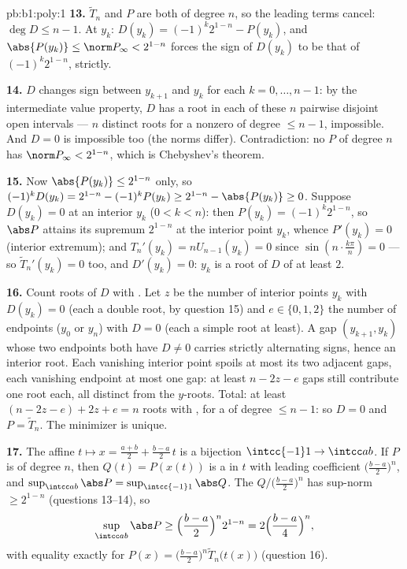 \begin{solution}{pb:b1:poly:1}
\textbf{13.} $\widetilde T_n$ and $P$ are both  of degree
$n$, so the leading terms cancel: $\deg D \leq n - 1$. At $y_k$:
$D(y_k) = (-1)^k2^{1-n} - P(y_k)$, and $\abs{P(y_k)} \leq \norm
P_\infty < 2^{1-n}$ forces the sign of $D(y_k)$ to be that of
$(-1)^k2^{1-n}$, strictly.

\textbf{14.} $D$ changes sign between $y_{k+1}$ and $y_k$ for each
$k = 0, \dots, n-1$: by the intermediate value property, $D$ has a
root in each of these $n$ pairwise disjoint open intervals --- $n$
distinct roots for a nonzero  of degree $\leq n - 1$,
impossible. And $D = 0$ is impossible too (the norms differ).
Contradiction: no  $P$ of degree $n$ has $\norm P_\infty <
2^{1-n}$, which is Chebyshev's theorem.

\textbf{15.} Now $\abs{P(y_k)} \leq 2^{1-n}$ only, so $(-1)^k
D(y_k) = 2^{1-n} - (-1)^kP(y_k) \geq 2^{1-n} - \abs{P(y_k)} \geq
0$. Suppose $D(y_k) = 0$ at an interior $y_k$ ($0 < k < n$): then
$P(y_k) = (-1)^k2^{1-n}$, so $\abs P$ attains its supremum
$2^{1-n}$ at the interior point $y_k$, whence $P'(y_k) = 0$
(interior extremum); and $T_n'(y_k) = nU_{n-1}(y_k) = 0$ since
$\sin(n\cdot\frac{k\pi}n) = 0$ --- so $\widetilde T_n'(y_k) = 0$
too, and $D'(y_k) = 0$: $y_k$ is a root of $D$ of  at
least $2$.

\textbf{16.} Count roots of $D$ with . Let $z$ be the
number of interior points $y_k$ with $D(y_k) = 0$ (each a double
root, by question 15) and $e \in \{0, 1, 2\}$ the number of
endpoints ($y_0$ or $y_n$) with $D = 0$ (each a simple root at
least). A gap $(y_{k+1}, y_k)$ whose two endpoints both have $D
\neq 0$ carries strictly alternating signs, hence an interior
root. Each vanishing interior point spoils at most its two
adjacent gaps, each vanishing endpoint at most one gap: at least
$n - 2z - e$ gaps still contribute one root each, all distinct
from the $y$-roots. Total: at least $(n - 2z - e) + 2z + e = n$
roots with , for a  of degree $\leq n - 1$:
so $D = 0$ and $P = \widetilde T_n$. The minimizer is unique.

\textbf{17.} The affine  $t \mapsto x = \frac{a+b}2 +
\frac{b-a}2\,t$ is a bijection $\intcc{-1}1 \to \intcc ab$. If $P$
is  of degree $n$, then $Q(t) = P(x(t))$ is a  in
$t$ with leading coefficient $\bigl(\frac{b-a}2\bigr)^n$, and
$\sup_{\intcc ab}\abs P = \sup_{\intcc{-1}1}\abs Q$. The  $Q/\bigl(\frac{b-a}2\bigr)^n$ has sup-norm $\geq
2^{1-n}$ (questions 13--14), so
\[
\sup_{\intcc ab}\abs P \geq \Bigl(\frac{b-a}2\Bigr)^n 2^{1-n}
= 2\Bigl(\frac{b-a}4\Bigr)^n ,
\]
with equality exactly for $P(x) = \bigl(\frac{b-a}2\bigr)^n
\widetilde T_n\bigl(t(x)\bigr)$ (question 16).


\end{solution}
